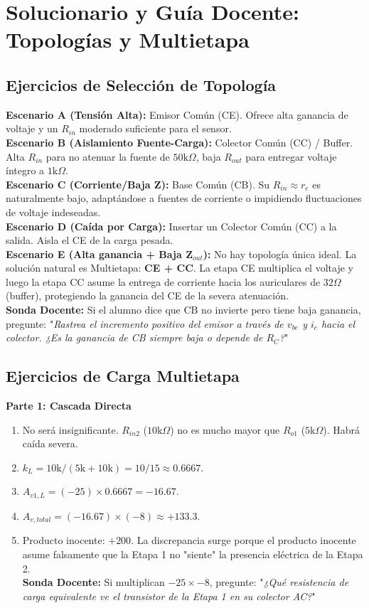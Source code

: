 \documentclass[11pt, a4paper]{article}
\begin{document}
\section*{Solucionario y Guía Docente: Topologías y Multietapa}

\subsection*{Ejercicios de Selección de Topología}
\textbf{Escenario A (Tensión Alta):} Emisor Común (CE). Ofrece alta ganancia de voltaje y un $R_{in}$ moderado suficiente para el sensor. \\
\textbf{Escenario B (Aislamiento Fuente-Carga):} Colector Común (CC) / Buffer. Alta $R_{in}$ para no atenuar la fuente de $50\text{k}\Omega$, baja $R_{out}$ para entregar voltaje íntegro a $1\text{k}\Omega$. \\
\textbf{Escenario C (Corriente/Baja Z):} Base Común (CB). Su $R_{in} \approx r_e$ es naturalmente bajo, adaptándose a fuentes de corriente o impidiendo fluctuaciones de voltaje indeseadas. \\
\textbf{Escenario D (Caída por Carga):} Insertar un Colector Común (CC) a la salida. Aisla el CE de la carga pesada. \\
\textbf{Escenario E (Alta ganancia + Baja Z$_{out}$):} No hay topología única ideal. La solución natural es Multietapa: \textbf{CE + CC}. La etapa CE multiplica el voltaje y luego la etapa CC asume la entrega de corriente hacia los auriculares de $32\Omega$ (buffer), protegiendo la ganancia del CE de la severa atenuación. \\
\textbf{Sonda Docente:} Si el alumno dice que CB no invierte pero tiene baja ganancia, pregunte: "\textit{Rastrea el incremento positivo del emisor a través de $v_{be}$ y $i_c$ hacia el colector. ¿Es la ganancia de CB siempre baja o depende de $R_C$?}"

\subsection*{Ejercicios de Carga Multietapa}
\textbf{Parte 1: Cascada Directa}
\begin{enumerate}
    \item No será insignificante. $R_{in2}$ ($10\text{k}\Omega$) no es mucho mayor que $R_{o1}$ ($5\text{k}\Omega$). Habrá caída severa.
    \item $k_L = 10\text{k} / (5\text{k} + 10\text{k}) = 10 / 15 \approx 0.6667$.
    \item $A_{v1,L} = (-25) \times 0.6667 = -16.67$.
    \item $A_{v,total} = (-16.67) \times (-8) \approx +133.3$.
    \item Producto inocente: $+200$. La discrepancia surge porque el producto inocente asume falsamente que la Etapa 1 no "siente" la presencia eléctrica de la Etapa 2. \\
    \textbf{Sonda Docente:} Si multiplican $-25 \times -8$, pregunte: "\textit{¿Qué resistencia de carga equivalente ve el transistor de la Etapa 1 en su colector AC?}"
\end{enumerate}
\end{document}
